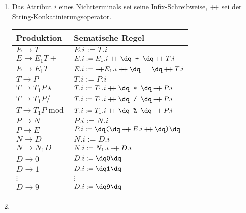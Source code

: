 \documentclass[a4paper,10pt]{scrartcl}
\begin{document}
\section{}
\begin{enumerate}
 \item  Das Attribut $i$ eines Nichtterminals sei seine Infix-Schreibweise, $\mathbin{+\mkern-5mu+}$ sei der String-Konkatinierungsoperator.
        \begin{center}
            \begin{tabular}{l|l}
                \textbf{Produktion} & \textbf{Sematische Regel} \\\hline
                $E \to T$                       & $E.i := T.i$ \\
                $E \to E_1 T +$                 & $E.i := E_1.i \concat \str{ + } \concat T.i$ \\
                $E \to E_1 T -$                 & $E.i := \concat E_1.i \concat \str{ - } \concat T.i$ \\
                $T \to P$                       & $T.i := P.i$ \\
                $T \to T_1 P \star$             & $T.i := T_1.i \concat \str{ * } \concat P.i$\\
                $T \to T_1 P /$                 & $T.i := T_1.i \concat \str{ / } \concat P.i$\\
                $T \to T_1 P \operatorname{mod}$& $T.i := T_1.i \concat \str{ \% } \concat P.i$\\
                $P \to N$                       & $P.i := N.i$\\
                $P \to E$                       & $P.i := \str{(} \concat E.i \concat \str{)}$\\
                $N \to D$                       & $N.i := D.i$\\
                $N \to N_1D$                    & $N.i := N_1.i \mathbin{+\mkern-5mu+} D.i$\\
                $D \to 0$                       & $D.i := \str{0}$\\
                $D \to 1$                       & $D.i := \str{1}$\\
                $\vdots$                        & $\vdots$\\
                $D \to 9$                       & $D.i := \str{9}$\\
            \end{tabular}
        \end{center}\pagebreak
 \item	\hspace{0cm}\\

\end{enumerate}
\end{document}
